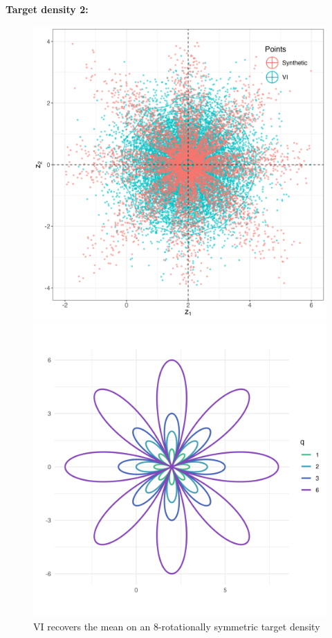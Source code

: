 \documentclass{article}
\begin{document}
\clearpage
\textbf{Target density 2:}
\begin{figure}[h!]
    \centering
    \begin{minipage}{0.6\textwidth}
        \centering
        \includegraphics[width=\linewidth]{plots/VI_ex2.png}
        \caption{VI recovers the mean on an 8-rotationally symmetric target density}
    \end{minipage}
    \hfill
    \begin{minipage}{0.45\textwidth}
        \centering
        \includegraphics[width=\linewidth]{plots/level_curves_ex2.png}

\end{minipage}
\end{figure}
\end{document}
